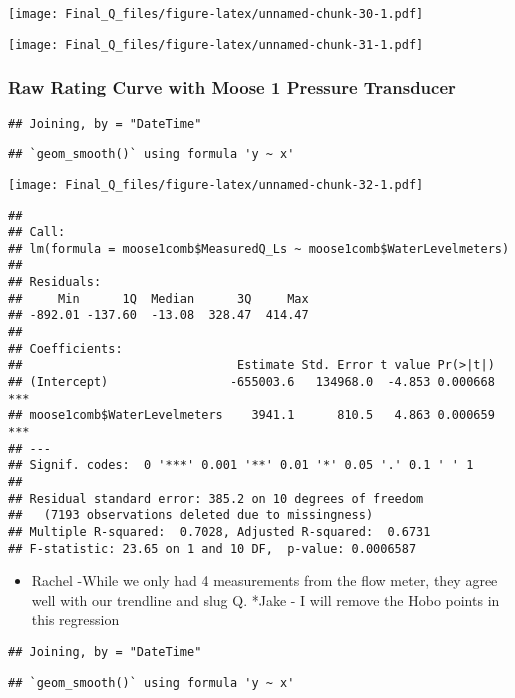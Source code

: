 \documentclass[
]{article}
\providecommand{\tightlist}{%
  \setlength{\itemsep}{0pt}\setlength{\parskip}{0pt}}
\begin{document}
\texttt{[image: Final\_Q\_files/figure-latex/unnamed-chunk-30-1.pdf]}

\texttt{[image: Final\_Q\_files/figure-latex/unnamed-chunk-31-1.pdf]}

\hypertarget{raw-rating-curve-with-moose-1-pressure-transducer-1}{%
\subsubsection{Raw Rating Curve with Moose 1 Pressure
Transducer}\label{raw-rating-curve-with-moose-1-pressure-transducer-1}}

\begin{verbatim}
## Joining, by = "DateTime"
\end{verbatim}

\begin{verbatim}
## `geom_smooth()` using formula 'y ~ x'
\end{verbatim}

\texttt{[image: Final\_Q\_files/figure-latex/unnamed-chunk-32-1.pdf]}

\begin{verbatim}
## 
## Call:
## lm(formula = moose1comb$MeasuredQ_Ls ~ moose1comb$WaterLevelmeters)
## 
## Residuals:
##     Min      1Q  Median      3Q     Max 
## -892.01 -137.60  -13.08  328.47  414.47 
## 
## Coefficients:
##                              Estimate Std. Error t value Pr(>|t|)    
## (Intercept)                 -655003.6   134968.0  -4.853 0.000668 ***
## moose1comb$WaterLevelmeters    3941.1      810.5   4.863 0.000659 ***
## ---
## Signif. codes:  0 '***' 0.001 '**' 0.01 '*' 0.05 '.' 0.1 ' ' 1
## 
## Residual standard error: 385.2 on 10 degrees of freedom
##   (7193 observations deleted due to missingness)
## Multiple R-squared:  0.7028, Adjusted R-squared:  0.6731 
## F-statistic: 23.65 on 1 and 10 DF,  p-value: 0.0006587
\end{verbatim}

\begin{itemize}
\tightlist
\item
  Rachel -While we only had 4 measurements from the flow meter, they
  agree well with our trendline and slug Q. *Jake - I will remove the
  Hobo points in this regression
\end{itemize}

\begin{verbatim}
## Joining, by = "DateTime"
\end{verbatim}

\begin{verbatim}
## `geom_smooth()` using formula 'y ~ x'
\end{verbatim}
\end{document}
